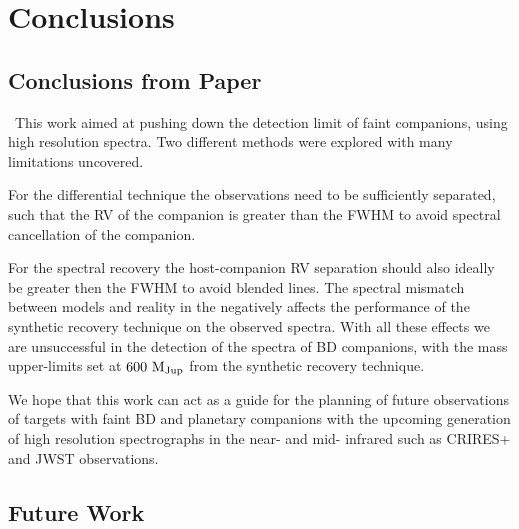
\chapter{Conclusions}  %

\label{cha:conclusions} 


\section{Conclusions from Paper}
\label{sec:conclusions}
\
This work aimed at pushing down the detection limit of faint companions, using high resolution \nir spectra. Two different methods were explored with many limitations uncovered. 
\unfinished{Update from paper}

For the differential technique the observations need to be sufficiently separated, such that the RV of the companion is greater than the FWHM to avoid spectral cancellation of the companion.
	
	For the spectral recovery the host-companion RV separation should also ideally be greater then the FWHM to avoid blended lines. The spectral mismatch between models and reality in the \nir negatively affects the performance of the synthetic recovery technique on the observed spectra. With all these effects we are unsuccessful in the detection of the \nir spectra of BD companions,  with the mass upper-limits set at \(\rm 600~M_{Jup}\) from the synthetic recovery technique.

We hope that this work can act as a guide for the planning of future observations of targets with faint BD and planetary companions with the upcoming generation of high resolution spectrographs in the near- and mid- infrared such as CRIRES+ and JWST observations.



\section{Future Work}
